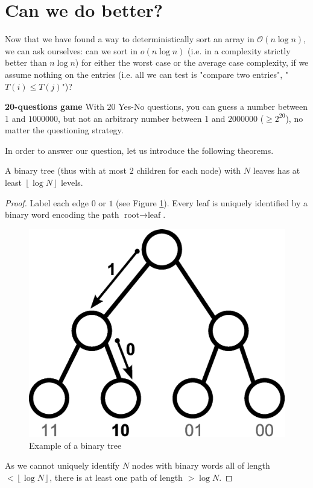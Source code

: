 \section{Can we do better?}

Now that we have found a way to deterministically sort an array in $\mathcal{O}(n\log n)$, we can ask ourselves: can we sort in $o(n \log n)$ (i.e. in a complexity strictly better than $n \log n$) for either the worst case or the average case complexity, if we assume nothing on the entries (i.e. all we can test is "compare two entries", "$T(i) \leq T(j)$")?\\

\begin{example}
\begin{leftbar}
\textbf{20-questions game} With $20$ Yes-No questions, you can guess a number between 1 and $1000000$, but not an arbitrary number between 1 and $2000000$ ($\geq 2^{20}$), no matter the questioning strategy.
\end{leftbar}
\end{example}

In order to answer our question, let us introduce the following theorems.\\

\begin{theorem}
A binary tree (thus with at most $2$ children for each node) with $N$ leaves has at least $\left\lfloor \log N \right\rfloor$ levels.
\end{theorem}
\begin{proof}
Label each edge $0$ or $1$ (see Figure \ref{tree6}). Every leaf is uniquely identified by a binary word encoding the path $\text{root} \rightarrow \text{leaf}$.\\
\begin{figure}[htbp]
\centering
\includegraphics[scale=0.5]{images/CM2/tree6.eps}
\caption{Example of a binary tree}
\label{tree6}
\end{figure}
As we cannot uniquely identify $N$ nodes with binary words all of length $< \left\lfloor \log N \right\rfloor$, there is at least one path of length $> \log N$.

\end{proof}

